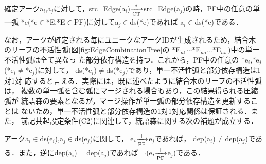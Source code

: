 \begin{lemma}[アークとアークを生成した弧の関係]
\label{lem:app2-1}
確定アークa$_i$,a$_j$に対して，src\_Edge(a$_i$)${\xrightarrow[{\rm
CT}]{*}}$src\_Edge(a$_j$)の時，PF中の任意の単一弧
*e(*e${\in}$*E,*E${\in}$PF)に対してa$_j{\in}$ds(*e)であれば
a$_i{\in}$ds(*e)である．
\end{lemma}

なお，アークが確定される毎にユニークなアークIDが生成されるため，結合木
のリーフの不活性弧(図\ref{fig:EdgeCombinationTree}の
*E$_{n1}{\cdots}$*E$_{no}{\ldots}$*E$_{nw}$)中の単一不活性弧は全て異なっ
た部分依存構造を持つ．これから，PF中の任意の
*e$_i$,*e$_j$(*e$_i{\neq}$*e$_j$)に対して，
ds(*e$_i$)${\neq}$ds(*e$_j$)であり，単一不活性弧と部分依存構造は1対1対
応すると言える．実際には，既に述べたように結合木のリーフの不活性弧は，
複数の単一弧を含む弧にマージされる場合もあり，この結果得られる圧縮弧が
統語森の要素となるが，マージ操作が単一弧の部分依存構造を更新することは
ないため，単一不活性弧と部分依存構造の1対1対応関係は保証される．また，
前記共起設定条件(C2)に関連して，統語森に関する次の補題が成立する．

\begin{lemma}[パス中の弧が含むアークに関する制約]
\label{lem:ArcConstraintOfArcsOnOnePath}
アークa$_i{\in}$ds(e$_i$),a$_j{\in}$ds(e$_j$)に関して，
e$_i{\xrightarrow[{\rm PF}]{{\tiny +}}}$e$_j$であれば，
dep(a$_i$)${\neq}$dep(a$_j$)である．また，逆にdep(a$_i$)$=$dep(a$_j$)であれば
¬(e$_i{\xrightarrow[{\rm PF}]{{\tiny +}}}$e$_j$)である．

\end{lemma}

